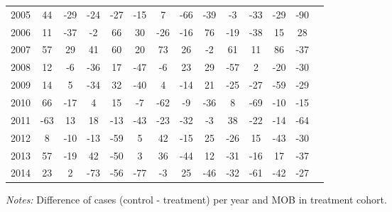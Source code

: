 \begin{table}[H]
\begin{threeparttable}
{\begin{tabular}{l*{13}{c}}
2005        &          44&         -29&         -24&         -27&         -15&           7&         -66&         -39&          -3&         -33&         -29&         -90\\
2006        &          11&         -37&          -2&          66&          30&         -26&         -16&          76&         -19&         -38&          15&          28\\
2007        &          57&          29&          41&          60&          20&          73&          26&          -2&          61&          11&          86&         -37\\
2008        &          12&          -6&         -36&          17&         -47&          -6&          23&          29&         -57&           2&         -20&         -30\\
2009        &          14&           5&         -34&          32&         -40&           4&         -14&          21&         -25&         -27&         -59&         -29\\
2010        &          66&         -17&           4&          15&          -7&         -62&          -9&         -36&           8&         -69&         -10&         -15\\
2011        &         -63&          13&          18&         -13&         -43&         -23&         -32&          -3&          38&         -22&         -14&         -64\\
2012        &           8&         -10&         -13&         -59&           5&          42&         -15&          25&         -26&          15&         -43&         -30\\
2013        &          57&         -19&          42&         -50&           3&          36&         -44&          12&         -31&         -16&          17&         -37\\
2014        &          23&           2&         -73&         -56&         -77&          -3&          25&         -46&         -32&         -61&         -42&         -27\\
 \bottomrule \end{tabular} } \begin{tablenotes} \item \scriptsize \emph{Notes:} Difference of cases (control - treatment) per year and MOB in treatment cohort. \end{tablenotes} \end{threeparttable} \end{table} 
